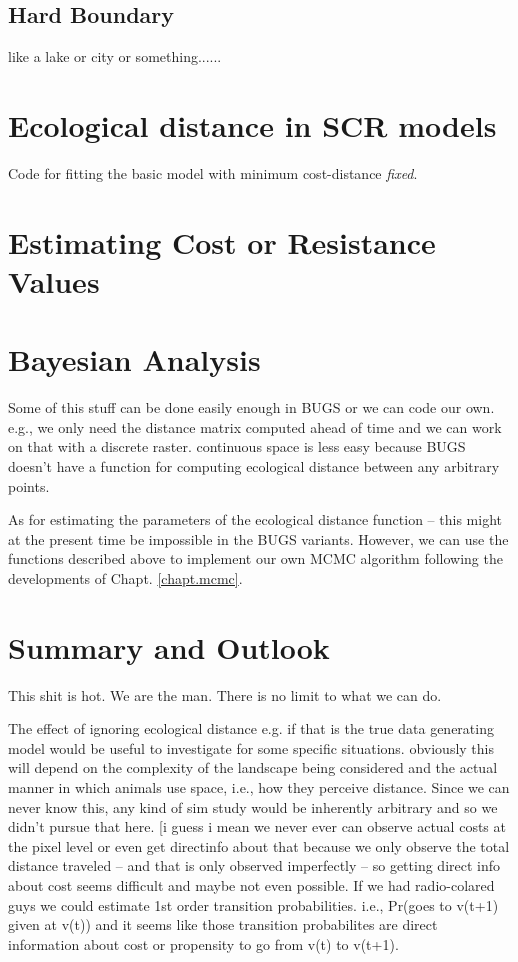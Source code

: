 \subsection{Hard Boundary}

like a lake or city or something......


\section{Ecological distance in SCR models}

Code for fitting the basic model  with minimum cost-distance {\it fixed}.

\section{Estimating Cost or Resistance Values}

\section{Bayesian Analysis}

Some of this stuff can be done easily enough in BUGS or we can code
our own. e.g., we only need the distance matrix computed ahead of time
and we can work on that with a discrete raster.  continuous space is
less easy because BUGS doesn't have a function for computing
ecological distance between any arbitrary points. 

As for estimating the parameters of the ecological distance function
-- this might at the present time be impossible in the BUGS
variants. However, we can use the functions described above to
implement our own MCMC algorithm following the developments of
Chapt. \ref{chapt.mcmc}.










\section{Summary and Outlook}

This shit is hot. We are the man. There is no limit to what we can do.


The effect of ignoring ecological distance e.g. if that is the true
data generating model would be useful to investigate for some specific
situations. obviously this will depend on the complexity of the
landscape being considered and the actual manner in which animals use
space, i.e., how they perceive distance. Since we can never know this,
any kind of sim study would be inherently arbitrary and so we didn't
pursue that here. [i guess i mean we never ever can observe actual
costs at the pixel level or even get directinfo about that because we
only observe the total distance traveled -- and that is only observed
imperfectly -- so getting direct info about cost seems difficult and
maybe not even possible. 
If we had radio-colared guys we could estimate 1st order transition
probabilities. i.e., Pr(goes to v(t+1) given at v(t)) and it seems
like those transition probabilites are direct information about cost
or propensity to go from v(t) to v(t+1).


